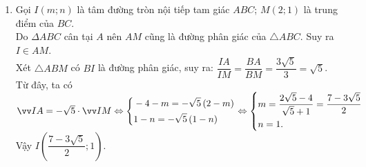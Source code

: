 \begin{bt}
{\begin{enumerate}
            Vậy $H\left(-\dfrac{2}{5};-\dfrac{4}{5}\right)$.
            \item Gọi $I(m;n)$ là tâm đường tròn nội tiếp tam giác $ABC$; $M\left(2;1\right)$ là trung điểm của $BC$.\\
            Do $\Delta ABC$ cân tại $A$ nên $AM$ cũng là đường phân giác của $\triangle ABC$. Suy ra $I \in AM$.\\
            Xét $\triangle ABM$ có $BI$ là đường phân giác, suy ra: $\dfrac{IA}{IM}=\dfrac{BA}{BM}=\dfrac{3\sqrt{5}}{3}=\sqrt{5}$.\\
            Từ đây, ta có $\vec{IA}=-\sqrt{5}\cdot \vec{IM}\Leftrightarrow \heva{&-4-m=-\sqrt{5}\left(2-m\right)\\& 1-n=-\sqrt{5}\left(1-n\right)}\Leftrightarrow \heva{&m=\dfrac{2\sqrt{5}-4}{\sqrt{5}+1}=\dfrac{7-3\sqrt{5}}{2}\\&n=1.}$\\
            Vậy $I\left(\dfrac{7-3\sqrt{5}}{2};1\right)$.
        \end{enumerate}
        }
\end{bt}

